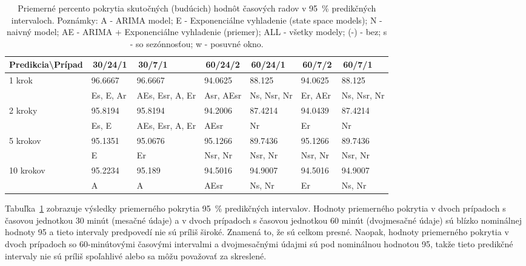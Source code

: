 \documentclass[thesismargins, thesislinespacing, openright, upjsfrontpage, combineabstracts]{rnthesis}
\begin{document}
\begin{table}[h]
    \centering
    \footnotesize 
    \singlespacing 
    \begin{tabular}{|p{3cm}|p{1.5cm}|p{1.5cm}|p{1.5cm}|p{1.5cm}|p{1.5cm}|p{1.5cm}|} \hline
        Predikcia\textbackslash Prípad & \,30/24/1\, & \,30/7/1\, & \,60/24/2\, & \,60/24/1\, & \,60/7/2\, & \,60/7/1\, \\
     \hline\hline
        \multirow{2}{*}{1 krok} & 96.6667 & 96.6667 & 94.0625 & 88.125 & 94.0625 & 88.125 \\
        & Es, E, Ar & AEs, Esr, A, Er & Asr, AEsr & Ns, Nsr, Nr & Er, AEr & Ns, Nsr, Nr  \\
        \hline
        \multirow{2}{*}{2 kroky} & 95.8194 & 95.8194 & 94.2006 & 87.4214 & 94.0439 & 87.4214 \\
        & Es, E & AEs, Esr, A, Er & AEsr & Nr & Er & Nr \\
        \hline
        \multirow{2}{*}{5 krokov} & 95.1351 & 95.0676 & 95.1266 & 89.7436 & 95.1266 & 89.7436 \\
        & E & Er & Nsr, Nr & Nsr, Nr & Nsr, Nr & Nsr, Nr  \\
        \hline
        \multirow{2}{*}{10 krokov} & 95.2234 & 95.189 & 94.5016 & 94.9007 & 94.5016 & 94.9007 \\
        & A & A & AEsr & Ns, Nr & Er & Ns, Nr \\
        \hline
    \end{tabular}
    \caption{Priemerné percento pokrytia skutočných (budúcich) hodnôt časových radov v 95~\% predikčných intervaloch. Poznámky: A - ARIMA model; E - Exponenciálne vyhladenie (state space models); N - naivný model; AE - ARIMA + Exponenciálne vyhladenie (priemer); ALL - všetky modely; (-) - bez; s - so sezónnosťou; w - posuvné okno.}
    \label{tab:avg_95}
\end{table}

Tabuľka~\ref{tab:avg_95} zobrazuje výsledky priemerného pokrytia 95~\% predikčných intervalov. Hodnoty priemerného pokrytia v dvoch prípadoch s časovou jednotkou 30 minút (mesačné údaje) a v dvoch prípadoch s časovou jednotkou 60 minút (dvojmesačné údaje) sú blízko nominálnej hodnoty 95 a tieto intervaly predpovedí nie sú príliš široké. Znamená to, že sú celkom presné. Naopak, hodnoty priemerného pokrytia v dvoch prípadoch so 60-minútovými časovými intervalmi a dvojmesačnými údajmi sú pod nominálnou hodnotou 95, takže tieto predikčné intervaly nie sú príliš spoľahlivé alebo sa môžu považovať za skreslené.
\end{document}

